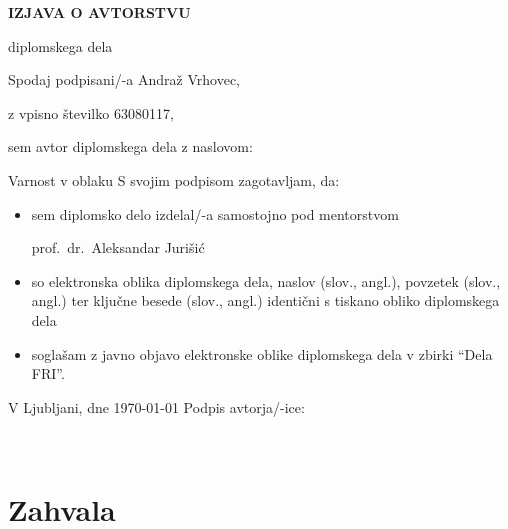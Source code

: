 \documentclass[12pt,a4paper,openany,tikz]{book}
\theoremstyle{plain}
\theoremstyle{definition}
\begin{document}
\vspace{1cm}
\begin{center}
{\Large \textbf{IZJAVA O AVTORSTVU}}
\end{center}

\begin{center}
{\Large diplomskega dela}
\end{center}

\vspace{1cm}
Spodaj podpisani/-a \hspace{0.5cm} Andraž Vrhovec,

\vspace{0.5cm}
z vpisno številko \hspace{0.5cm} 63080117,

\vspace{1cm}
sem avtor diplomskega dela z naslovom:

\vspace{0.5cm}
Varnost v oblaku
\vspace{1.5cm}
S svojim podpisom zagotavljam, da:
\begin{itemize}
	\item sem diplomsko delo izdelal/-a samostojno pod mentorstvom

	prof.\ dr.\ Aleksandar Jurišić

	\item	so elektronska oblika diplomskega dela, naslov (slov., angl.), povzetek (slov., angl.) ter ključne besede (slov., angl.) identični s tiskano obliko diplomskega dela
	\item soglašam z javno objavo elektronske oblike diplomskega dela v zbirki ``Dela FRI''.
\end{itemize}

\vspace{1cm}
V Ljubljani, dne \today \hspace{1cm} Podpis avtorja/-ice:

\newpage


\ \thispagestyle{empty}

\newpage



\chapter*{Zahvala}
\end{document}
